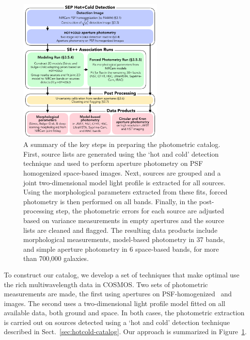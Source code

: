 \documentclass[longauth]{aa}
\begin{document}
\begin{figure}[t!] 
\begin{center}
\includegraphics[width=0.65\textwidth]{figures/flowchart3.pdf}
\caption{A summary of the key steps in preparing the photometric catalog. First, source lists are generated using the `hot and cold' detection technique and used to perform aperture photometry on PSF homogenized space-based images. Next, sources are grouped and a joint two-dimensional model light profile is extracted for all sources. Using the morphological parameters extracted from these fits, forced photometry is then performed on all bands. Finally, in the post-processing step, the photometric errors for each source are adjusted based on variance measurements in empty apertures and the source lists are cleaned and flagged. The resulting data products include morphological measurements, model-based photometry in 37 bands, and simple aperture photometry in 6 space-based bands, for more than 700,000 galaxies. 
}
\label{fig:flowchart}
\end{center}
\end{figure}

To construct our catalog, we develop a set of techniques that make optimal use the rich multiwavelength data in COSMOS. Two sets of photometric measurements are made, the first using apertures on PSF-homogenized \JWST\ and \hst{} images. The second uses a two-dimensional light profile model fitted on all available data, both ground and space. In both cases, the photometric extraction is carried out on sources detected using a `hot and cold' detection technique described in Sect.~\ref{sec:hotcold-catalog}. Our approach is summarized in Figure~\ref{fig:flowchart}. 
\end{document}
